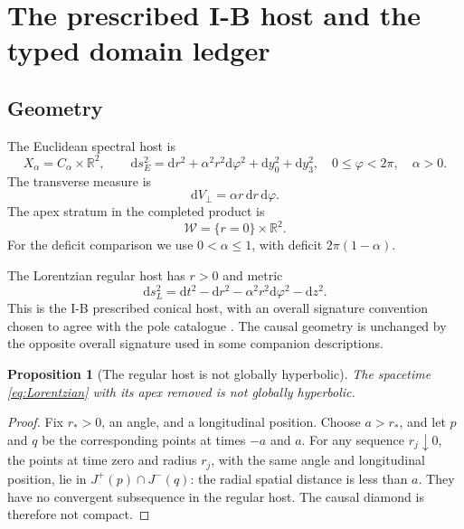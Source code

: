 \documentclass[11pt,a4paper]{article}
\newcommand{\RR}{\mathbb R}
\newcommand{\dd}{\mathrm d}
\newcommand{\WW}{\mathcal W}
\theoremstyle{plain}
\newtheorem{proposition}[theorem]{Proposition}
\theoremstyle{definition}
\theoremstyle{remark}
\numberwithin{equation}{section}
\begin{document}
\section{The prescribed I-B host and the typed domain ledger}
\label{sec:host}

\subsection{Geometry}

The Euclidean spectral host is
\begin{equation}
 X_\alpha=C_\alpha\times\RR^2,\qquad
 \dd s_E^2=\dd r^2+\alpha^2r^2\dd\varphi^2
             +\dd y_0^2+\dd y_3^2,
 \quad 0\le\varphi<2\pi,\quad \alpha>0.
 \label{eq:Euclidean}
\end{equation}
The transverse measure is
\[
 \dd V_\perp=\alpha r\,\dd r\,\dd\varphi.
\]
The apex stratum in the completed product is
\[
 \WW=\{r=0\}\times\RR^2.
\]
For the deficit comparison we use \(0<\alpha\le1\), with deficit
\(2\pi(1-\alpha)\).

The Lorentzian regular host has \(r>0\) and metric
\begin{equation}
 \dd s_L^2=\dd t^2-\dd r^2-\alpha^2r^2\dd\varphi^2-\dd z^2.
 \label{eq:Lorentzian}
\end{equation}
This is the I-B prescribed conical host, with an overall
signature convention chosen to agree with the pole catalogue
\cite{CheungIB}. The causal geometry is unchanged by the
opposite overall signature used in some companion descriptions.

\begin{proposition}[The regular host is not globally hyperbolic]
\label{prop:nonGH}
The spacetime \eqref{eq:Lorentzian} with its apex removed is not
globally hyperbolic.
\end{proposition}

\begin{proof}
Fix \(r_*>0\), an angle, and a longitudinal position. Choose
\(a>r_*\), and let \(p\) and \(q\) be the corresponding points at
times \(-a\) and \(a\).
For any sequence \(r_j\downarrow0\), the points at time zero and
radius \(r_j\), with the same angle and longitudinal position,
lie in \(J^+(p)\cap J^-(q)\): the radial spatial distance is
less than \(a\).
They have no convergent subsequence in the regular host.
The causal diamond is therefore not compact.
\end{proof}
\end{document}
